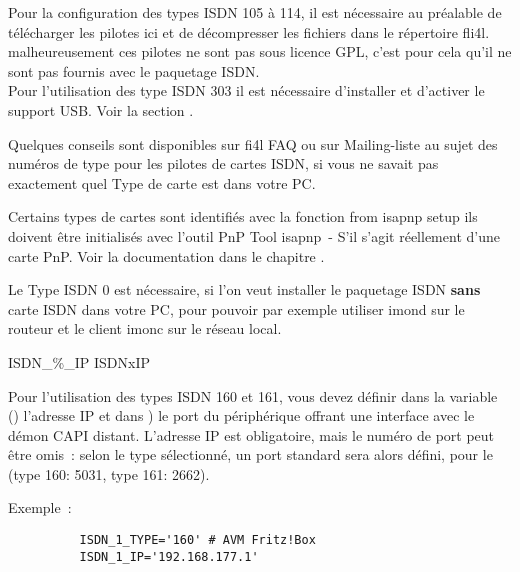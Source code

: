 \begin{description}
  Pour la configuration des types ISDN 105 à 114, il est nécessaire au préalable de télécharger
  les pilotes ici 
  et de décompresser les fichiers dans le répertoire fli4l. malheureusement ces
  pilotes ne sont pas sous licence GPL, c'est pour cela qu'il ne sont pas fournis
  avec le paquetage ISDN.\\

  Pour l'utilisation des type ISDN 303 il est nécessaire d'installer et
  d'activer le support USB. Voir la section
  .

  Quelques conseils sont disponibles sur fi4l FAQ ou sur Mailing-liste au sujet
  des numéros de type pour les pilotes de cartes ISDN, si vous ne savait pas exactement
  quel Type de carte est dans votre PC.

  Certains types de cartes sont identifiés avec la fonction \flqq{}from isapnp setup\frqq{}
  ils doivent être initialisés avec l'outil PnP Tool isapnp~- S'il s'agit réellement
  d'une carte PnP. Voir la documentation dans le chapitre
  .

  Le Type ISDN 0 est nécessaire, si l'on veut installer le paquetage ISDN \textbf{sans}
  carte ISDN dans votre PC, pour pouvoir par exemple utiliser imond sur le routeur
  et le client imonc sur le réseau local.

 {ISDN\_\%\_IP} {ISDNxIP}

  Pour l'utilisation des types ISDN 160 et 161, vous devez définir dans la variable
  () l'adresse IP et dans ) le port du périphérique
  offrant une interface avec le démon CAPI distant. L'adresse IP est obligatoire, mais le numéro
  de port peut être omis~: selon le type sélectionné, un port standard sera alors défini, pour
  le (type 160: 5031, type 161: 2662).

  Exemple~:
  \begin{example}
  \begin{verbatim}
          ISDN_1_TYPE='160' # AVM Fritz!Box
          ISDN_1_IP='192.168.177.1'
  \end{verbatim}
  \end{example}



\end{description}
